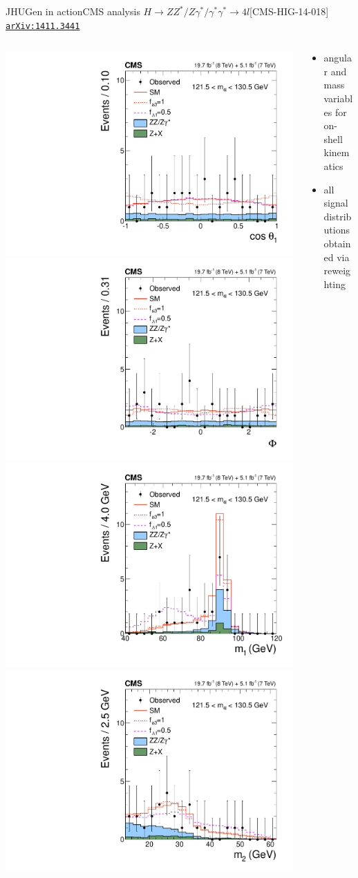 \documentclass[usenames,dvipsnames,svgnames,table]{beamer}
\newcommand{\arxiv}[1]{\href{http://arxiv.org/abs/#1}{\nolinkurl{arXiv:#1}}}
\begin{document}
\begin{frame}{JHUGen in action}{CMS analysis $H \to ZZ^*/Z\gamma^*/\gamma^*\gamma^* \to 4l$\hfill [CMS-HIG-14-018] \arxiv{1411.3441}}
\begin{columns}
\begin{column}{0.6\textwidth}
\includegraphics[width=.5\columnwidth]{HVV/costheta1}
\includegraphics[width=.5\columnwidth]{HVV/Phi} \\
\includegraphics[width=.5\columnwidth]{HVV/m1}
\includegraphics[width=.5\columnwidth]{HVV/m2}
\end{column}
\begin{column}{0.4\textwidth}
\begin{itemize}
\item angular and mass variables for on-shell kinematics
\item all signal distributions obtained via reweighting
\end{itemize}
\end{column}
\end{columns}
\end{frame}
\end{document}
